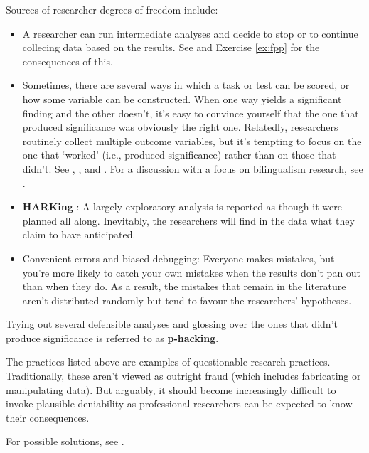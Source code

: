 \documentclass[a4paper]{tufte-book}\usepackage[]{graphicx}\usepackage[]{xcolor}
\newcommand{\term}[1]{\textbf{#1}}
\begin{document}
Sources of researcher degrees of freedom include:

\begin{itemize}
  \item A researcher can run intermediate analyses 
  and decide to stop or to continue collecing data based on the results. 
  See \citet{Simmons2011} and Exercise \ref{ex:fpp} for the consequences of this.
  
  \item Sometimes, there are several ways in which a task or test can be
  scored, or how some variable can be constructed.
  When one way yields a significant finding and the other doesn't,
  it's easy to convince yourself that the one that produced significance
  was obviously the right one. 
  Relatedly, researchers routinely collect multiple outcome variables, but
  it's tempting to focus on the one that `worked' (i.e., produced significance)
  rather than on those that didn't.
  See \citet{Simmons2011},
  \citet{Gelman2013}, and 
  \citet{Malsburg2017}. For a discussion with a focus on bilingualism
  research, see \citet{Poarch2018}.
  
  \item \term{HARKing} \citep[hypothesizing after the results are known;][]{Kerr1998}: 
  A largely exploratory analysis is reported as though it were planned all along.
  Inevitably, the researchers will find in the data what they claim to have
  anticipated.
  
  \item Convenient errors and biased debugging: 
  Everyone makes mistakes, but you're more likely to catch your own
  mistakes when the results don't pan out than when they do.
  As a result, the mistakes that remain in the literature aren't
  distributed randomly but tend to favour the researchers' hypotheses.
  
\end{itemize}

Trying out several defensible analyses and glossing over the ones
that didn't produce significance is referred to as \term{p-hacking}.

The practices listed above are examples of questionable research practices.
Traditionally, these aren't viewed as outright fraud (which includes 
fabricating or manipulating data).
But arguably, it should become increasingly difficult to invoke plausible deniability 
as professional researchers can be expected to know their consequences.

For possible solutions, see \citet{Chambers2017}.
\end{document}

